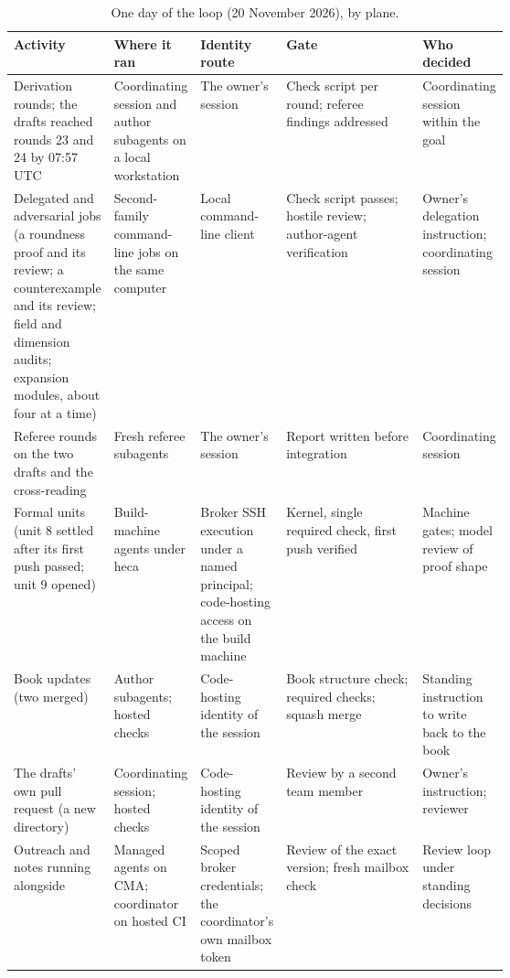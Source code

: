 \documentclass[11pt]{article}
\newcommand{\code}[1]{\texttt{\detokenize{#1}}}
\begin{document}
\begin{table}[htbp]
\centering\footnotesize
\caption{One day of the loop (20 November 2026), by plane.}
\label{tab:oneday}
\begin{tabularx}{\linewidth}{@{}>{\raggedright\arraybackslash}p{0.17\linewidth}>{\raggedright\arraybackslash}p{0.17\linewidth}>{\raggedright\arraybackslash}p{0.16\linewidth}>{\raggedright\arraybackslash}X>{\raggedright\arraybackslash}p{0.13\linewidth}@{}}
\toprule
Activity & Where it ran & Identity route & Gate & Who decided \\
\midrule
Derivation rounds; the drafts reached rounds 23 and 24 by 07:57 UTC & Coordinating session and author subagents on a local workstation & The owner's session & Check script per round; referee findings addressed & Coordinating session within the goal \\
Delegated and adversarial jobs (a roundness proof and its review; a counterexample and its review; field and dimension audits; expansion modules, about four at a time) & Second-family command-line jobs on the same computer & Local command-line client & Check script passes; hostile review; author-agent verification & Owner's delegation instruction; coordinating session \\
Referee rounds on the two drafts and the cross-reading & Fresh referee subagents & The owner's session & Report written before integration & Coordinating session \\
Formal units (unit 8 settled after its first push passed; unit 9 opened) & Build-machine agents under heca & Broker SSH execution under a named principal; code-hosting access on the build machine & Kernel, single required check, first push verified & Machine gates; model review of proof shape \\
Book updates (two merged) & Author subagents; hosted checks & Code-hosting identity of the session & Book structure check; required checks; squash merge & Standing instruction to write back to the book \\
The drafts' own pull request (a new \code{paper/} directory) & Coordinating session; hosted checks & Code-hosting identity of the session & Review by a second team member & Owner's instruction; reviewer \\
Outreach and notes running alongside & Managed agents on CMA; coordinator on hosted CI & Scoped broker credentials; the coordinator's own mailbox token & Review of the exact version; fresh mailbox check & Review loop under standing decisions \\
\bottomrule
\end{tabularx}
\end{table}
\end{document}
